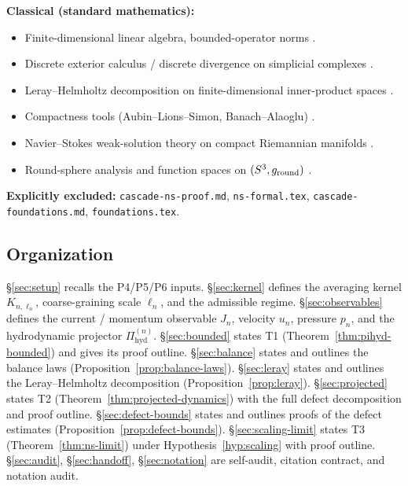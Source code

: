 \documentclass[11pt, a4paper]{amsart}
\theoremstyle{definition}
\newcommand{\Pihyd}{\Pi_{\mathrm{hyd}}}
\begin{document}
\textbf{Classical (standard mathematics):}
\begin{itemize}
\item Finite-dimensional linear algebra, bounded-operator norms
  \cite{ReedSimonI}.
\item Discrete exterior calculus / discrete divergence on
  simplicial complexes \cite{Chung}.
\item Leray--Helmholtz decomposition on finite-dimensional
  inner-product spaces \cite{ArnoldFalkWinther}.
\item Compactness tools (Aubin--Lions--Simon, Banach--Alaoglu)
  \cite{SimonCompactness, BrezisFA}.
\item Navier--Stokes weak-solution theory on compact Riemannian
  manifolds \cite{TemamNS, LionsMathTopics}.
\item Round-sphere analysis and function spaces on $(S^3,
  g_{\rm round})$ \cite{BerardSpectralGeometry, TaylorPDE1}.
\end{itemize}

\textbf{Explicitly excluded:}
\texttt{cascade-ns-proof.md}, \texttt{ns-formal.tex},
\texttt{cascade-foundations.md}, \texttt{foundations.tex}.

\subsection{Organization}

\S\ref{sec:setup} recalls the P4/P5/P6 inputs.
\S\ref{sec:kernel} defines the averaging kernel $K_{n,\ell_n}$,
coarse-graining scale $\ell_n$, and the admissible regime.
\S\ref{sec:observables} defines the current / momentum
observable $J_n$, velocity $u_n$, pressure $p_n$, and the
hydrodynamic projector $\Pihyd^{(n)}$.
\S\ref{sec:bounded} states T1 (Theorem~\ref{thm:pihyd-bounded})
and gives its proof outline.
\S\ref{sec:balance} states and outlines the balance laws
(Proposition~\ref{prop:balance-laws}).
\S\ref{sec:leray} states and outlines the Leray--Helmholtz
decomposition (Proposition~\ref{prop:leray}).
\S\ref{sec:projected} states T2
(Theorem~\ref{thm:projected-dynamics}) with the full defect
decomposition and proof outline.
\S\ref{sec:defect-bounds} states and outlines proofs of the
defect estimates (Proposition~\ref{prop:defect-bounds}).
\S\ref{sec:scaling-limit} states T3
(Theorem~\ref{thm:ns-limit}) under
Hypothesis~\ref{hyp:scaling} with proof outline.
\S\ref{sec:audit}, \S\ref{sec:handoff}, \S\ref{sec:notation}
are self-audit, citation contract, and notation audit.

\end{document}
